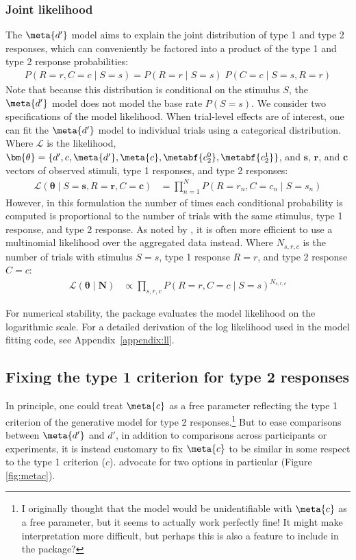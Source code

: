 \subsubsection{Joint likelihood}
The $\meta{d'}$ model aims to explain the joint distribution of type 1 and type 2 responses, which can conveniently be factored into a product of the type 1 and type 2 response probabilities: 
\begin{align*}
    P(R=r, C=c \;\vert\; S=s) = 
P(R=r \;\vert\; S=s) \; P(C=c \;\vert\; S=s, R=r) 
\end{align*}
Note that because this distribution is conditional on the stimulus $S$, the $\meta{d'}$ model does not model the base rate $P(S=s)$. We consider two specifications of the model likelihood. When trial-level effects are of interest, one can fit the $\meta{d'}$ model to individual trials using a categorical distribution. Where $\mathcal{L}$ is the likelihood, $\bm{\theta} = \{d', c, \meta{d'}, \meta{c}, \metabf{c_2^0}, \metabf{c_2^1}\}$, and $\bm{s}$, $\bm{r}$, and $\bm{c}$ vectors of observed stimuli, type 1 responses, and type 2 responses:
\begin{align*}
    \mathcal{L}(\bm{\theta} \;\vert\; S=\bm{s},R=\bm{r},C=\bm{c}) &= \prod_{n=1}^N P(R=r_n, C=c_n \;\vert\; S=s_n)
\end{align*}
However, in this formulation the number of times each conditional probability is computed is proportional to the number of trials with the same stimulus, type 1 response, and type 2 response. As noted by \textcite{maniscalco2014}, it is often more efficient to use a multinomial likelihood over the aggregated data instead. Where $N_{s,r,c}$ is the number of trials with stimulus $S=s$, type 1 response $R=r$, and type 2 response $C=c$:
\begin{align*}
    \mathcal{L}(\bm{\theta} \;\vert\; \bm{N}) &\propto \prod_{s,r,c} P(R=r, C=c \;\vert\; S=s)^{N_{s,r,c}}
\end{align*}

For numerical stability, the \hmetad{} package evaluates the model likelihood on the logarithmic scale. For a detailed derivation of the log likelihood used in the model fitting code, see Appendix~\ref{appendix:ll}.



\subsection{Fixing the type 1 criterion for type 2 responses}
In principle, one could treat $\meta{c}$ as a free parameter reflecting the type 1 criterion of the generative model for type 2 responses.\footnote{I originally thought that the model would be unidentifiable with $\meta{c}$ as a free parameter, but it seems to actually work perfectly fine! It might make interpretation more difficult, but perhaps this is also a feature to include in the package?} But to ease comparisons between $\meta{d'}$ and $d'$, in addition to comparisons across participants or experiments, it is instead customary to fix $\meta{c}$ to be similar in some respect to the type 1 criterion ($c$). \textcite{maniscalco2014} advocate for two options in particular (Figure \ref{fig:metac}).

